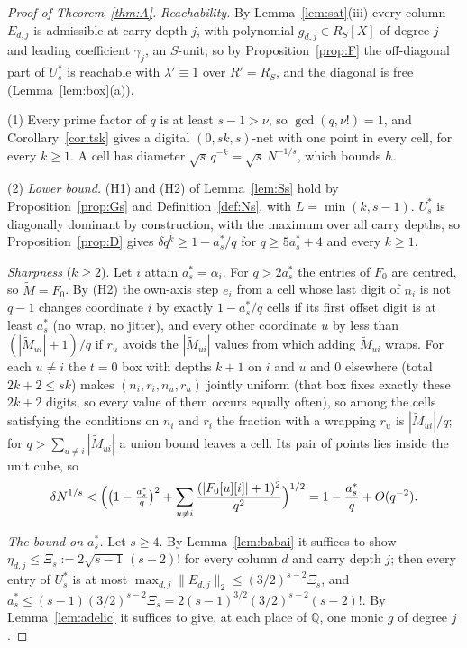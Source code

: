 \documentclass[11pt]{amsart}
\theoremstyle{definition}
\theoremstyle{plain}
\begin{document}
\begin{proof}[Proof of Theorem~\ref{thm:A}]
\emph{Reachability.} By Lemma~\ref{lem:sat}(iii) every column $E_{d,j}$ is admissible at carry depth $j$, with polynomial $g_{d,j}\in R_S[X]$ of degree $j$ and leading coefficient $\gamma_j$, an $S$-unit; so by Proposition~\ref{prop:F} the off-diagonal part of $U^*_s$ is reachable with $\lambda'\equiv1$ over $R'=R_S$, and the diagonal is free (Lemma~\ref{lem:box}(a)).

(1) Every prime factor of $q$ is at least $s-1>\nu$, so $\gcd(q,\nu!)=1$, and Corollary~\ref{cor:tsk} gives a digital $(0,sk,s)$-net with one point in every cell, for every $k\ge1$. A cell has diameter $\sqrt s\,q^{-k}=\sqrt s\,N^{-1/s}$, which bounds $h$.

(2) \emph{Lower bound.} (H1) and (H2) of Lemma~\ref{lem:Ss} hold by Proposition~\ref{prop:Gs} and Definition~\ref{def:Ns}, with $L=\min(k,s-1)$. $U^*_s$ is diagonally dominant by construction, with the maximum over all carry depths, so Proposition~\ref{prop:D} gives $\delta q^k\ge1-a^*_s/q$ for $q\ge5a^*_s+4$ and every $k\ge1$.

\emph{Sharpness} ($k\ge2$). Let $i$ attain $a^*_s=\alpha_i$. For $q>2a^*_s$ the entries of $F_0$ are centred, so $\tilde M=F_0$. By (H2) the own-axis step $e_i$ from a cell whose last digit of $n_i$ is not $q-1$ changes coordinate $i$ by exactly $1-a^*_s/q$ cells if its first offset digit is at least $a^*_s$ (no wrap, no jitter), and every other coordinate $u$ by less than $(|\tilde M_{ui}|+1)/q$ if $r_u$ avoids the $|\tilde M_{ui}|$ values from which adding $\tilde M_{ui}$ wraps. For each $u\ne i$ the $t=0$ box with depths $k+1$ on $i$ and $u$ and $0$ elsewhere (total $2k+2\le sk$) makes $(n_i,r_i,n_u,r_u)$ jointly uniform (that box fixes exactly these $2k+2$ digits, so every value of them occurs equally often), so among the cells satisfying the conditions on $n_i$ and $r_i$ the fraction with a wrapping $r_u$ is $|\tilde M_{ui}|/q$; for $q>\sum_{u\ne i}|\tilde M_{ui}|$ a union bound leaves a cell. Its pair of points lies inside the unit cube, so
\[
\delta N^{1/s}<\Bigl(\bigl(1-\tfrac{a^*_s}q\bigr)^2+\sum_{u\ne i}\frac{(|F_0[u][i]|+1)^2}{q^2}\Bigr)^{1/2}=1-\frac{a^*_s}q+O(q^{-2}).
\]

\emph{The bound on $a^*_s$.} Let $s\ge4$. By Lemma~\ref{lem:babai} it suffices to show $\eta_{d,j}\le \Xi_s:=2\sqrt{s-1}\,(s-2)!$ for every column $d$ and carry depth $j$; then every entry of $U^*_s$ is at most $\max_{d,j}\|E_{d,j}\|_2\le(3/2)^{s-2}\Xi_s$, and $a^*_s\le(s-1)(3/2)^{s-2}\Xi_s=2(s-1)^{3/2}(3/2)^{s-2}(s-2)!$. By Lemma~\ref{lem:adelic} it suffices to give, at each place of $\mathbb Q$, one monic $g$ of degree $j$.


\end{proof}
\end{document}
